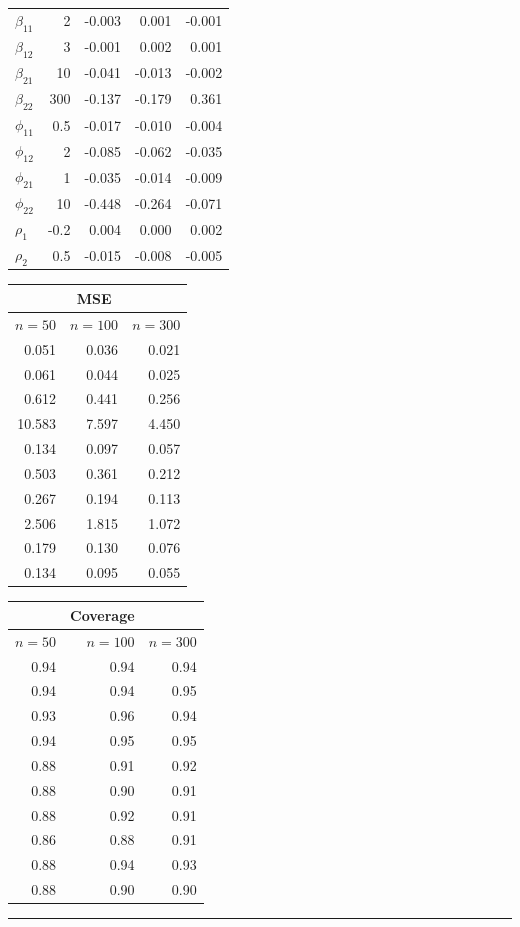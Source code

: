 \documentclass[useAMS,referee]{biom}
\begin{document}
\begin{table}[htb]
\begin{minipage}[b]{.43\textwidth}
\begin{tabular}{lrrrr}
	$\beta_{11}$ &	2&-0.003&	0.001&	-0.001\\
	$\beta_{12}$ &	3&-0.001&	0.002&	0.001\\
	$\beta_{21}$&10& -0.041&	-0.013&	-0.002\\
	$\beta_{22}$&300&-0.137&	-0.179&	0.361\\
	$\phi_{11}$	&0.5&-0.017&	-0.010&	-0.004\\
	$\phi_{12}$&2&-0.085&	-0.062&	-0.035\\
	$\phi_{21}$	&1&-0.035&	-0.014&	-0.009\\
	$\phi_{22}$	&10&-0.448&	-0.264&	-0.071\\
	$\rho_1$	&-0.2&0.004&	0.000&	0.002\\
	$\rho_2$&	0.5	&-0.015&	-0.008&	-0.005\\
\end{tabular}
\end{minipage}
\begin{minipage}[b]{.28\textwidth}
\begin{tabular}{rrr} 
	& \multicolumn{1}{c}{MSE}  &\\
	\hline
	$n=50$ & $n=100$ & $n=300$   \\ 	
	\midrule 
	0.051&	0.036&	0.021\\
	0.061&	0.044&	0.025\\
	0.612&	0.441&	0.256\\
	10.583&	7.597&	4.450\\
	0.134&	0.097&	0.057\\
	0.503&	0.361&	0.212\\
	0.267&	0.194&	0.113\\
	2.506&	1.815&	1.072\\
	0.179&	0.130&	0.076\\
	0.134&	0.095&	0.055\\	
\end{tabular}
\end{minipage}
\begin{minipage}[b]{.1\textwidth}	
\begin{tabular}{rrr} 
	& \multicolumn{1}{c}{Coverage} &  \\ 
	\hline
	$n=50$ & $n=100$ & $n=300$   \\ 	
	\hline 
	0.94&	0.94&	0.94\\
	0.94&	0.94&	0.95\\
	0.93&	0.96&	0.94\\
	0.94&	0.95&	0.95\\
	0.88&	0.91&	0.92\\
	0.88&	0.90&	0.91\\
	0.88&	0.92&	0.91\\
	0.86&	0.88&	0.91\\
	0.88&	0.94&	0.93\\
	0.88&	0.90&	0.90\\	
\end{tabular}
\end{minipage}
\hrule
\end{table}
\end{document}
